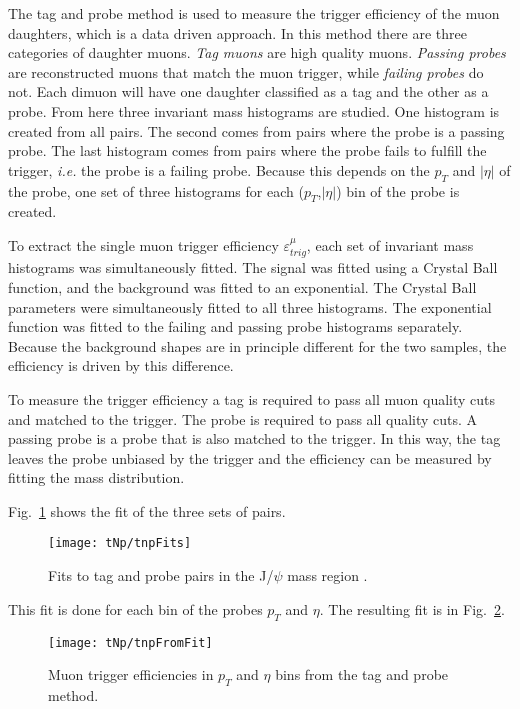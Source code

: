       The tag and probe method is used to measure the trigger efficiency of 
        the muon daughters, which is a data driven approach. 
      In this method there are three categories of daughter muons. 
      \textit{Tag muons} are high quality muons.
      \textit{Passing probes} are reconstructed muons that match the muon trigger, 
        while \textit{failing probes} do not. 
      Each dimuon will have one daughter classified as a tag and the other
        as a probe.
      From here three invariant mass histograms are studied. 
      One histogram is created from all pairs. 
      The second comes from pairs where the probe is a passing probe.  
      The last histogram comes from pairs where the probe fails to fulfill
        the trigger, \textit{i.e.} the probe is a failing probe. 
      Because this depends on the $p_{T}$ and $|\eta|$ of the probe, one set 
        of three histograms for each ($p_{T}$,$|\eta|$) bin of the probe is 
        created.

      To extract the single muon trigger efficiency $\varepsilon^{\mu}_{trig}$, 
        each set of invariant mass histograms was simultaneously fitted. 
      The signal was fitted using a Crystal Ball function, and the background 
        was fitted to an exponential.
      The Crystal Ball parameters were simultaneously fitted to all three 
        histograms.
      The exponential function was fitted to the failing and passing probe 
        histograms separately.
      Because the background shapes are in principle different for the two 
        samples, the efficiency is driven by this difference. 

      To measure the trigger efficiency a tag is required to pass all muon
        quality cuts and matched to the trigger.
      The probe is required to pass all quality cuts. 
      A passing probe is a probe that is also matched to the trigger. 
      In this way, the tag leaves the probe unbiased by the trigger and the 
        efficiency can be measured by fitting the mass distribution.  

      Fig.~\ref{fig:tnpFitPlot} shows the fit of the three sets of pairs. 
      \begin{figure}[!Hh]
        \centering
        \texttt{[image: tNp/tnpFits]}
        \caption{Fits to tag and probe pairs in the J/$\psi$ mass region \DIFaddbeginFL {}\pt {}\DIFaddendFL .}
        \label{fig:tnpFitPlot}
      \end{figure}
      This fit is done for each bin of the probes $p_{T}$ and $\eta$.
      The resulting fit is in Fig.~\ref{fig:tnpTrigMap}.
      \begin{figure}[!Hhbt]
        \centering
        \texttt{[image: tNp/tnpFromFit]}
        \caption{Muon trigger efficiencies in $p_{T}$ and $\eta$ bins from 
          the tag and probe method.}
        \label{fig:tnpTrigMap}
      \end{figure}

